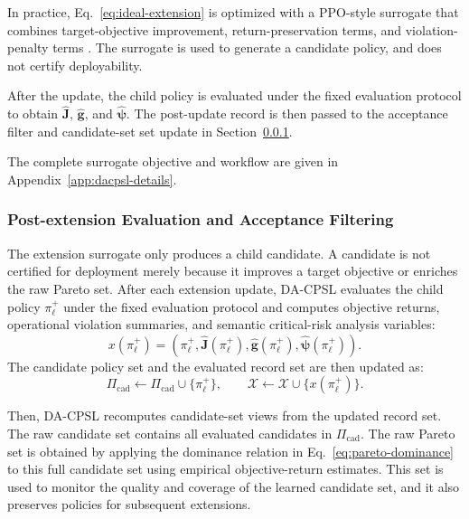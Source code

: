 \documentclass[sigconf,review,anonymous]{acmart}
\begin{document}
In practice, Eq.~\ref{eq:ideal-extension} is optimized with a PPO-style surrogate that combines target-objective improvement, return-preservation terms, and violation-penalty terms \cite{schulman2017ppo,achiam2017cpo,liu2020ipo}.
The surrogate is used to generate a candidate policy, and does not certify deployability.

After the update, the child policy is evaluated under the fixed
evaluation protocol to obtain \(\widehat{\mathbf{J}}\),
\(\widehat{\mathbf{g}}\), and \(\widehat{\boldsymbol{\psi}}\). The
post-update record is then passed to the acceptance filter and
candidate-set set update in Section~\ref{subsec:dacpsl-archive-update}.

The complete surrogate objective and workflow are given in Appendix~\ref{app:dacpsl-details}.

\subsubsection{Post-extension Evaluation and Acceptance Filtering}
\label{subsec:dacpsl-archive-update}

The extension surrogate only produces a child candidate. A candidate is
not certified for deployment merely because it improves a target
objective or enriches the raw Pareto set. After each extension update,
DA-CPSL evaluates the child policy \(\pi_{\ell}^{+}\) under the fixed
evaluation protocol and computes objective returns, operational violation
summaries, and semantic critical-risk analysis variables:
\begin{equation}
x(\pi_{\ell}^{+})
=
\left(
\pi_{\ell}^{+},
\widehat{\mathbf{J}}(\pi_{\ell}^{+}),
\widehat{\mathbf{g}}(\pi_{\ell}^{+}),
\widehat{\boldsymbol{\psi}}(\pi_{\ell}^{+})
\right).
\label{eq:child-record}
\end{equation}
The candidate policy set and the evaluated record set are then updated as:
\begin{equation}
\Pi_{\mathrm{cad}}
\leftarrow
\Pi_{\mathrm{cad}}
\cup
\{\pi_{\ell}^{+}\},
\qquad
\mathcal{X}
\leftarrow
\mathcal{X}
\cup
\{x(\pi_{\ell}^{+})\}.
\label{eq:archive-update}
\end{equation}

Then, DA-CPSL recomputes candidate-set views from the updated record set.
The raw candidate set contains all evaluated candidates in
\(\Pi_{\mathrm{cad}}\). The raw Pareto set is obtained by applying the
dominance relation in Eq.~\ref{eq:pareto-dominance} to this full
candidate set using empirical objective-return estimates. This set is
used to monitor the quality and coverage of the learned candidate set,
and it also preserves policies for subsequent extensions.
\end{document}
